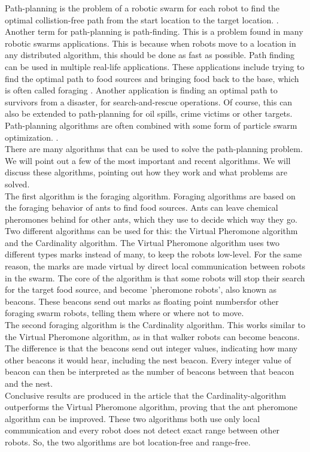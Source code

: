 
Path-planning is the problem of a robotic swarm for each robot to find the optimal collistion-free path from the start location to the target location. \cite{qin2004path}.
Another term for path-planning is path-finding. 
This is a problem found in many robotic swarms applications.
This is because when robots move to a location in any distributed algorithm, this should be done as fast as possible. 
Path finding can be used in multiple real-life applications.
These applications include trying to find the optimal path to food sources and bringing food back to the base, which is often called foraging \cite{hoff2010two}.
Another application is finding an optimal path to survivors from a disaster, for search-and-rescue operations.
Of course, this can also be extended to path-planning for oil spills, crime victims or other targets.\cite{pugh2007inspiring} 
Path-planning algorithms are often combined with some form of particle swarm optimization. \cite{poli2007particle}. \\

There are many algorithms that can be used to solve the path-planning problem. 
We will point out a few of the most important and recent algorithms. \cite{hoff2010two} \cite{bhattacharjee2011multi} \cite{jung2010multi} \cite{kala2012multi}
We will discuss these algorithms, pointing out how they work and what problems are solved. \\

The first algorithm is the foraging algorithm. \cite{hoff2010two}
Foraging algorithms are based on the foraging behavior of ants to find food sources. 
Ants can leave chemical pheromones behind for other ants, which they use to decide which way they go. 
Two different algorithms can be used for this: the Virtual Pheromone algorithm and the Cardinality algorithm.
The Virtual Pheromone algorithm uses two different types marks instead of many, to keep the robots low-level. 
For the same reason, the marks are made virtual by direct local communication between robots in the swarm.
The core of the algorithm is that some robots will stop their search for the target food source, and become 'pheromone robots', also known as beacons.
These beacons send out marks as floating point numbersfor other foraging swarm robots, telling them where or where not to move. \\
The second foraging algorithm is the Cardinality algorithm. 
This works similar to the Virtual Pheromone algorithm, as in that walker robots can become beacons. 
The difference is that the beacons send out integer values, indicating how many other beacons it would hear, including the nest beacon. 
Every integer value of beacon can then be interpreted as the number of beacons between that beacon and the nest. \\
Conclusive results are produced in the article that the Cardinality-algorithm outperforms the Virtual Pheromone algorithm, proving that the ant pheromone algorithm can be improved.
These two algorithms both use only local communication and every robot does not detect exact range between other robots.
So, the two algorithms are bot location-free and range-free. \\

